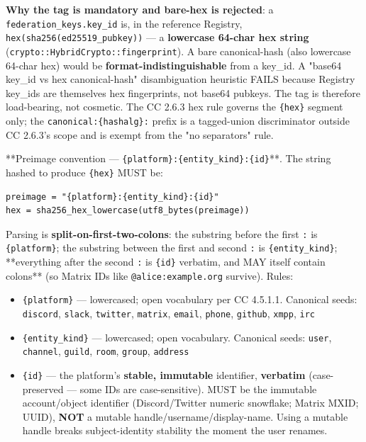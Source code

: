 \documentclass[11pt]{article}
\begin{document}
\textbf{Why the tag is mandatory and bare-hex is rejected}: a \texttt{federation\_keys.key\_id} is, in the reference Registry, \texttt{hex(sha256(ed25519\_pubkey))} — a \textbf{lowercase 64-char hex string} (\texttt{crypto::HybridCrypto::fingerprint}). A bare canonical-hash (also lowercase 64-char hex) would be \textbf{format-indistinguishable} from a key\_id. A "base64 key\_id vs hex canonical-hash" disambiguation heuristic FAILS because Registry key\_ids are themselves hex fingerprints, not base64 pubkeys. The tag is therefore load-bearing, not cosmetic. The CC 2.6.3 hex rule governs the \texttt{\{hex\}} segment only; the \texttt{canonical:\{hashalg\}:} prefix is a tagged-union discriminator outside CC 2.6.3's scope and is exempt from the "no separators" rule.


**Preimage convention — \texttt{\{platform\}:\{entity\_kind\}:\{id\}}**. The string hashed to produce \texttt{\{hex\}} MUST be:


\begin{lstlisting}
preimage = "{platform}:{entity_kind}:{id}"
hex = sha256_hex_lowercase(utf8_bytes(preimage))
\end{lstlisting}

Parsing is \textbf{split-on-first-two-colons}: the substring before the first \texttt{:} is \texttt{\{platform\}}; the substring between the first and second \texttt{:} is \texttt{\{entity\_kind\}}; **everything after the second \texttt{:} is \texttt{\{id\}} verbatim, and MAY itself contain colons** (so Matrix IDs like \texttt{@alice:example.org} survive). Rules:


\begin{itemize}\setlength\itemsep{0pt}
\item \texttt{\{platform\}} — lowercased; open vocabulary per CC 4.5.1.1. Canonical seeds: \texttt{discord}, \texttt{slack}, \texttt{twitter}, \texttt{matrix}, \texttt{email}, \texttt{phone}, \texttt{github}, \texttt{xmpp}, \texttt{irc}
\item \texttt{\{entity\_kind\}} — lowercased; open vocabulary. Canonical seeds: \texttt{user}, \texttt{channel}, \texttt{guild}, \texttt{room}, \texttt{group}, \texttt{address}
\item \texttt{\{id\}} — the platform's \textbf{stable, immutable} identifier, \textbf{verbatim} (case-preserved — some IDs are case-sensitive). MUST be the immutable account/object identifier (Discord/Twitter numeric snowflake; Matrix MXID; UUID), \textbf{NOT} a mutable handle/username/display-name. Using a mutable handle breaks subject-identity stability the moment the user renames.
\end{itemize}
\end{document}
